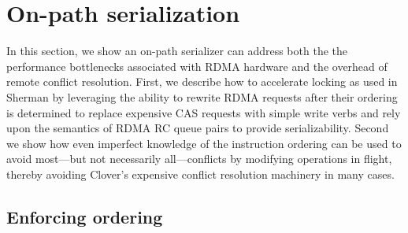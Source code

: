 \section{On-path serialization}

In this section, we show an on-path serializer can address both the
the performance bottlenecks associated with RDMA hardware and the
overhead of remote conflict resolution.  First, we describe how to
accelerate locking as used in Sherman by leveraging the ability to
rewrite RDMA requests after their ordering is determined to replace
expensive CAS requests with simple write verbs and rely upon the
semantics of RDMA RC queue pairs to provide serializability.
Second we show how even imperfect knowledge of the instruction ordering
can be used to avoid most---but not necessarily all---conflicts by
modifying operations in flight, thereby avoiding Clover's expensive
conflict resolution machinery in many cases.




\subsection{Enforcing ordering}


